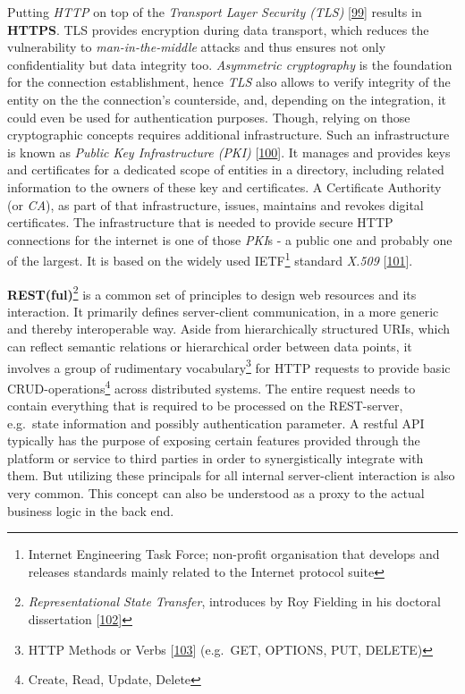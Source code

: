 \documentclass[12pt,english,a4paper,titlepage,cleardoublepage=empty,dottedtoc]{report}
\begin{document}
Putting \emph{HTTP} on top of the \emph{Transport Layer Security (TLS)}
{[}\protect\hyperlink{ref-web_spec_tls}{99}{]} results in
\textbf{HTTPS}. TLS provides encryption during data transport, which
reduces the vulnerability to \emph{man-in-the-middle} attacks and thus
ensures not only confidentiality but data integrity too.
\emph{Asymmetric cryptography} is the foundation for the connection
establishment, hence \emph{TLS} also allows to verify integrity of the
entity on the the connection's counterside, and, depending on the
integration, it could even be used for authentication purposes. Though,
relying on those cryptographic concepts requires additional
infrastructure. Such an infrastructure is known as \emph{Public Key
Infrastructure (PKI)}
{[}\protect\hyperlink{ref-book_2014_chapter-14-5-pki}{100}{]}. It
manages and provides keys and certificates for a dedicated scope of
entities in a directory, including related information to the owners of
these key and certificates. A Certificate Authority (or \emph{CA}), as
part of that infrastructure, issues, maintains and revokes digital
certificates. The infrastructure that is needed to provide secure HTTP
connections for the internet is one of those \emph{PKI}s - a public one
and probably one of the largest. It is based on the widely used
IETF\footnote{Internet Engineering Task Force; non-profit organisation
  that develops and releases standards mainly related to the Internet
  protocol suite} standard \emph{X.509}
{[}\protect\hyperlink{ref-web_spec_x509}{101}{]}.

\textbf{REST(ful)}\footnote{\emph{Representational State Transfer},
  introduces by Roy Fielding in his doctoral dissertation
  {[}\protect\hyperlink{ref-web_spec_rest}{102}{]}} is a common set of
principles to design web resources and its interaction. It primarily
defines server-client communication, in a more generic and thereby
interoperable way. Aside from hierarchically structured URIs, which can
reflect semantic relations or hierarchical order between data points, it
involves a group of rudimentary vocabulary\footnote{HTTP Methods or
  Verbs {[}\protect\hyperlink{ref-web_spec_http-methods}{103}{]}
  (e.g.~GET, OPTIONS, PUT, DELETE)} for HTTP requests to provide basic
CRUD-operations\footnote{Create, Read, Update, Delete} across
distributed systems. The entire request needs to contain everything that
is required to be processed on the REST-server, e.g.~state information
and possibly authentication parameter. A restful API typically has the
purpose of exposing certain features provided through the platform or
service to third parties in order to synergistically integrate with
them. But utilizing these principals for all internal server-client
interaction is also very common. This concept can also be understood as
a proxy to the actual business logic in the back end.
\end{document}

